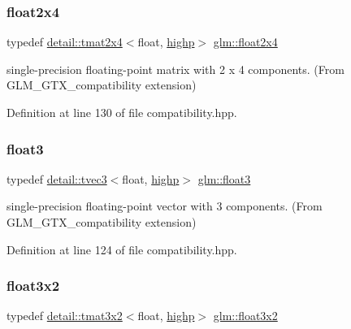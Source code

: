 \subsubsection{\texorpdfstring{float2x4}{float2x4}}
{\footnotesize\ttfamily typedef \hyperlink{structglm_1_1detail_1_1tmat2x4}{detail\+::tmat2x4}$<$float, \hyperlink{namespaceglm_a0f04f086094c747d227af4425893f545ac6f7eab42eacbb10d59a58e95e362074}{highp}$>$ \hyperlink{group__gtx__compatibility_gaaff795523eb814705d3f1cc7fd3421f2}{glm\+::float2x4}}



single-\/precision floating-\/point matrix with 2 x 4 components. (From G\+L\+M\+\_\+\+G\+T\+X\+\_\+compatibility extension) 



Definition at line 130 of file compatibility.\+hpp.

\mbox{\label{group__gtx__compatibility_ga7e0d8fa3501c0a7eaaca31adb6e02de2}} 
\subsubsection{\texorpdfstring{float3}{float3}}
{\footnotesize\ttfamily typedef \hyperlink{structglm_1_1detail_1_1tvec3}{detail\+::tvec3}$<$float, \hyperlink{namespaceglm_a0f04f086094c747d227af4425893f545ac6f7eab42eacbb10d59a58e95e362074}{highp}$>$ \hyperlink{group__gtx__compatibility_ga7e0d8fa3501c0a7eaaca31adb6e02de2}{glm\+::float3}}



single-\/precision floating-\/point vector with 3 components. (From G\+L\+M\+\_\+\+G\+T\+X\+\_\+compatibility extension) 



Definition at line 124 of file compatibility.\+hpp.

\mbox{\label{group__gtx__compatibility_ga19bcbd4d65c70cd07907b2d688bc84ed}} 
\subsubsection{\texorpdfstring{float3x2}{float3x2}}
{\footnotesize\ttfamily typedef \hyperlink{structglm_1_1detail_1_1tmat3x2}{detail\+::tmat3x2}$<$float, \hyperlink{namespaceglm_a0f04f086094c747d227af4425893f545ac6f7eab42eacbb10d59a58e95e362074}{highp}$>$ \hyperlink{group__gtx__compatibility_ga19bcbd4d65c70cd07907b2d688bc84ed}{glm\+::float3x2}}



